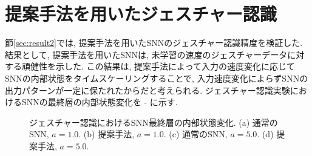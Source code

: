 \section{提案手法を用いたジェスチャー認識}
節\ref{sec:result2}では, 提案手法を用いたSNNのジェスチャー認識精度を検証した.
結果として, 提案手法を用いたSNNは, 未学習の速度のジェスチャーデータに対する頑健性を示した.
この結果は, 提案手法によって入力の速度変化に応じてSNNの内部状態をタイムスケーリングすることで, 入力速度変化によらずSNNの出力パターンが一定に保たれたからだと考えられる.
ジェスチャー認識実験におけるSNNの最終層の内部状態変化を - に示す.
\begin{figure}[htbp]
    \centering

    \begin{minipage}{0.45\textwidth}
        \centering
        
        \label{fig:discussion:snn:a1}
    \end{minipage}
    \hspace{0.02\textwidth}
    \begin{minipage}{0.45\textwidth}
        \centering
        
        \label{fig:discussion:proposed:a1}
    \end{minipage}

    \begin{minipage}{0.45\textwidth}
        \centering
        
        \label{fig:discussion:snn:a5}
    \end{minipage}
    \hspace{0.02\textwidth}
    \begin{minipage}{0.45\textwidth}
        \centering
        
        \label{fig:discussion:proposed:a5}
    \end{minipage}


    \caption[ジェスチャー認識におけるSNN最終層の内部状態変化]{
        ジェスチャー認識におけるSNN最終層の内部状態変化.
        (a) 通常のSNN, $a=1.0$.
        (b) 提案手法, $a=1.0$.
        (c) 通常のSNN, $a=5.0$.
        (d) 提案手法, $a=5.0$.
    }
\end{figure}
